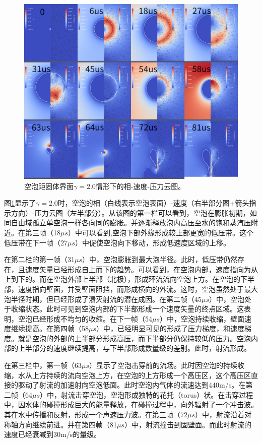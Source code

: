 \begin{figure}[h]
    \centering
    \includegraphics[width=0.9\linewidth]{img/solid2.0.png}
    \caption{空泡距固体界面$\gamma=2.0$情形下的相-速度-压力云图。}
    \label{fig3.gamma2}
\end{figure}
图\ref{fig3.gamma2}显示了$\gamma=2.0$时，空泡的相（白线表示空泡表面）-速度（右半部分图+箭头指示方向）-压力云图（左半部分）。从该图的第一栏可以看到，空泡在膨胀初期，如同自由域孤立单空泡一样各向同的膨胀。并逐渐释放泡内高压至水的饱和蒸汽压附近。在第三帧（18$\mu s$）中可以看到,空泡下部外缘形成较上部更宽的低压带。这个低压带在下一帧（27$\mu s$）中促使空泡向下移动，形成低速度区域的上移。

在第二栏的第一帧（31$\mu s$）中，空泡膨胀到最大泡半径。此时，低压带仍然存在，且速度矢量已经形成自上而下的趋势。可以看到，在空泡内部，速度指向为从上到下的。而在空泡外部上半部（北极），形成环流流向空泡上方。在空泡的下半部，速度指向壁面，并受壁面阻挡，而形成横向的外流。这时，空泡虽然处于最大泡半径时期，但已经形成了溃灭射流的潜在成因。在第二帧（45$\mu s$）中，空泡处于收缩状态。此时可见到空泡内部的下半部形成一个速度矢量的终点区域。这表明，空泡已经形成不均匀的收缩。在下一帧（54$\mu s$）中，空泡持续收缩，壁面速度继续提高。在第四帧（58$\mu s$）中，已经明显可见的形成了压力梯度，和速度梯度。就是空泡的外部的上半部分形成高压，而下半部分仍保持较低的压力。空泡内部的上半部分的速度继续提高，与下半部形成数量级的差别。此时，射流形成。

在第三栏中，第一帧（63$\mu s$）显示了空泡击穿前的流场。此时因空泡的持续收缩，水从上方持续的流向空泡上方，在空泡的上方形成一个高压区，这个高压区直接的驱动了射流的加速射向空泡低面。此时空泡内气体的流速达到440m/s。在第二帧（64$\mu s$）中，射流击穿空泡，空泡形成独特的花托（torus）状。在击穿过程中，因水体的碰撞形成巨大的能量释放，在碰撞过程中，向外辐射了一个冲击波。其在水中传播和反射，形成一个声速压力波。在第三帧（72$\mu s$）中，射流沿着对称轴方向继续前进。并在第四帧（81$\mu s$）中，射流撞击到固壁面。而此时射流的速度已经衰减到30m/s的量级。

